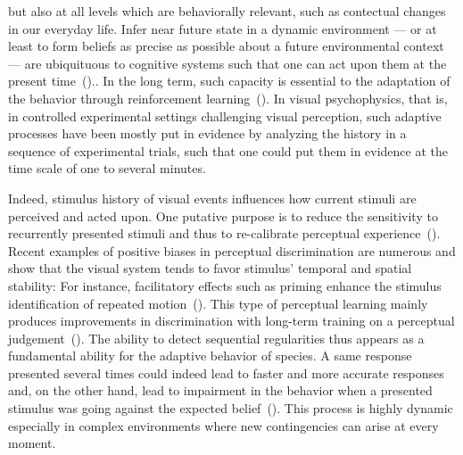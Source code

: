 \documentclass[profile,final,english, draft]{article}%
\newcommand{\citep}[1]{(\cite{#1})}
\begin{document}
but also at all levels which are behaviorally relevant,
such as contectual changes in our everyday life.
Infer near future state in a dynamic environment ---
or at least to form beliefs as precise as possible
about a future environmental context ---
are ubiquituous to cognitive systems
such that one can act upon them at the present time~\citep{ref}..
In the long term, such capacity is essential to the adaptation
of the behavior through reinforcement learning~\citep{ref}.
In visual psychophysics, that is,
in controlled experimental settings challenging visual perception,
such adaptive processes have been mostly put in evidence
by analyzing the history in a sequence of experimental trials,
such that one could put them in evidence
at the time scale of one to several minutes.

Indeed, stimulus history of visual events influences
how current stimuli are perceived and acted upon.
One putative purpose is to reduce
the sensitivity to recurrently presented stimuli and
thus to re-calibrate perceptual experience~\citep{Clifford2007, Webster2011, Kohn2007}.
Recent examples of positive biases in perceptual discrimination are
numerous and show that the visual system tends
to favor stimulus' temporal and spatial stability:
For instance, facilitatory effects such as priming
enhance the stimulus identification of repeated motion~\citep{Verstraten1994, Tiest2009}.
This type of perceptual learning mainly produces improvements in discrimination
with long-term training on a perceptual judgement~\citep{Lu2009}.
The ability to detect sequential regularities
thus appears as a fundamental ability
for the adaptive behavior of species.
A same response presented several times could indeed
lead to faster and more accurate responses and,
on the other hand, lead to impairment in the behavior
when a presented stimulus was going
against the expected belief~\citep{Hyman1953, Yu2009}.
This process is highly dynamic especially in complex environments
where new contingencies can arise at every moment.
\end{document}
